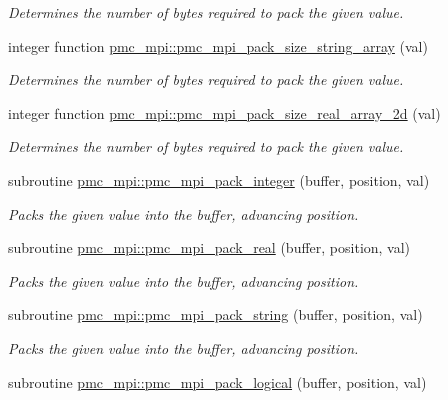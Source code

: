 \begin{DoxyCompactItemize}
\begin{DoxyCompactList}\small\item\em Determines the number of bytes required to pack the given value. \end{DoxyCompactList}\item 
integer function \mbox{\hyperlink{namespacepmc__mpi_af8c1a5c67870b10d526b694eb81d1cfd}{pmc\+\_\+mpi\+::pmc\+\_\+mpi\+\_\+pack\+\_\+size\+\_\+string\+\_\+array}} (val)
\begin{DoxyCompactList}\small\item\em Determines the number of bytes required to pack the given value. \end{DoxyCompactList}\item 
integer function \mbox{\hyperlink{namespacepmc__mpi_a2a1623c5cced2ab99048a47dda8c00f1}{pmc\+\_\+mpi\+::pmc\+\_\+mpi\+\_\+pack\+\_\+size\+\_\+real\+\_\+array\+\_\+2d}} (val)
\begin{DoxyCompactList}\small\item\em Determines the number of bytes required to pack the given value. \end{DoxyCompactList}\item 
subroutine \mbox{\hyperlink{namespacepmc__mpi_a2a91d7e00881e5ca711b2d0e8888c99b}{pmc\+\_\+mpi\+::pmc\+\_\+mpi\+\_\+pack\+\_\+integer}} (buffer, position, val)
\begin{DoxyCompactList}\small\item\em Packs the given value into the buffer, advancing position. \end{DoxyCompactList}\item 
subroutine \mbox{\hyperlink{namespacepmc__mpi_a31bf74ee3630d12e15608dc16d564318}{pmc\+\_\+mpi\+::pmc\+\_\+mpi\+\_\+pack\+\_\+real}} (buffer, position, val)
\begin{DoxyCompactList}\small\item\em Packs the given value into the buffer, advancing position. \end{DoxyCompactList}\item 
subroutine \mbox{\hyperlink{namespacepmc__mpi_a1e017c3cb891a6b0dbe1076d89ad255a}{pmc\+\_\+mpi\+::pmc\+\_\+mpi\+\_\+pack\+\_\+string}} (buffer, position, val)
\begin{DoxyCompactList}\small\item\em Packs the given value into the buffer, advancing position. \end{DoxyCompactList}\item 
subroutine \mbox{\hyperlink{namespacepmc__mpi_a2480cf79bf376716fc38a026b5e01873}{pmc\+\_\+mpi\+::pmc\+\_\+mpi\+\_\+pack\+\_\+logical}} (buffer, position, val)

\end{DoxyCompactItemize}
